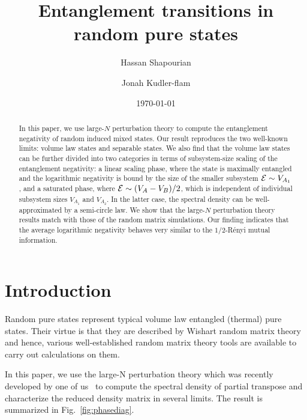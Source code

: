 \documentclass[aps,pra,groupedaddress,onecolumn,notitlepage,superscriptaddress,10pt]{revtex4-1}
\begin{document}
\title{Entanglement transitions in random pure states}
\author{Hassan Shapourian%
  }
\author{Jonah Kudler-flam}


\date{\today}

\begin{abstract}
In this paper, we use large-$N$ perturbation theory to compute the entanglement negativity of random induced mixed states. Our result reproduces the two well-known limits: volume law states and separable states. We also find that the volume law states can be further divided into two categories in terms of subsystem-size scaling  of the entanglement  negativity: a linear scaling phase, where the state is maximally entangled and the logarithmic negativity is bound by the size of the smaller subsystem ${\cal E}\sim V_{A_1}$, and a saturated phase, where ${\cal E}\sim (V_{A}-V_B)/2$, which  is independent of individual subsystem sizes $V_{A_1}$ and $V_{A_2}$. In the latter case, the spectral density can be well-approximated by a semi-circle law. We show that the large-$N$ perturbation theory results match with those of the random matrix simulations.
Our finding indicates that the average logarithmic negativity behaves very similar to the $1/2$-R\'enyi mutual information.
\end{abstract}

\maketitle

\section{Introduction}

Random pure states represent typical volume law entangled  (thermal) pure states. Their virtue is that they are described by Wishart random matrix theory and hence, various well-established random matrix theory tools are available to carry out calculations on them.

In this paper, we use the large-N perturbation theory which was recently developed by one of us~\cite{SLA20} to compute the spectral density of partial transpose and characterize the reduced density matrix in several limits. The result is summarized in Fig.~\ref{fig:phasediag}.
\end{document}
